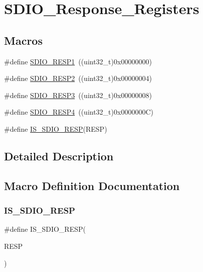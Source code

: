 \hypertarget{group___s_d_i_o___response___registers}{}\section{S\+D\+I\+O\+\_\+\+Response\+\_\+\+Registers}
\label{group___s_d_i_o___response___registers}
\subsection*{Macros}
\begin{DoxyCompactItemize}
\item 
\#define \mbox{\hyperlink{group___s_d_i_o___response___registers_ga9d78943952cf0e36736313d949520a2d}{S\+D\+I\+O\+\_\+\+R\+E\+S\+P1}}~((uint32\+\_\+t)0x00000000)
\item 
\#define \mbox{\hyperlink{group___s_d_i_o___response___registers_gabd551272af4161844b5358fd3c3c379c}{S\+D\+I\+O\+\_\+\+R\+E\+S\+P2}}~((uint32\+\_\+t)0x00000004)
\item 
\#define \mbox{\hyperlink{group___s_d_i_o___response___registers_gae9887669a72395d54d600829a959d2f4}{S\+D\+I\+O\+\_\+\+R\+E\+S\+P3}}~((uint32\+\_\+t)0x00000008)
\item 
\#define \mbox{\hyperlink{group___s_d_i_o___response___registers_ga57c3f6414198e5497736e398c02a1d9e}{S\+D\+I\+O\+\_\+\+R\+E\+S\+P4}}~((uint32\+\_\+t)0x0000000\+C)
\item 
\#define \mbox{\hyperlink{group___s_d_i_o___response___registers_gaea6a7f75a5e677d50ba5c9ae2d3a7839}{I\+S\+\_\+\+S\+D\+I\+O\+\_\+\+R\+E\+SP}}(R\+E\+SP)
\end{DoxyCompactItemize}


\subsection{Detailed Description}


\subsection{Macro Definition Documentation}
\mbox{\label{group___s_d_i_o___response___registers_gaea6a7f75a5e677d50ba5c9ae2d3a7839}} 
\subsubsection{\texorpdfstring{IS\_SDIO\_RESP}{IS\_SDIO\_RESP}}
{\footnotesize\ttfamily \#define I\+S\+\_\+\+S\+D\+I\+O\+\_\+\+R\+E\+SP(\begin{DoxyParamCaption}\item[{}]{R\+E\+SP }\end{DoxyParamCaption})}

